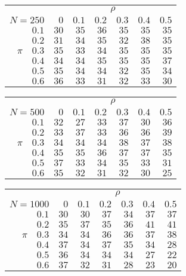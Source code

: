 \begin{tabular}{r|rrrrrr}
\hline\hline
 &\multicolumn{6}{c}{$\rho$} \\ 
 $N = 250$ & $0$ & $0.1$ & $0.2$ & $0.3$ & $0.4$ & $0.5$ \\ 
 \hline$0.1$ & $30$ & $35$ & $36$ & $35$ & $35$ & $35$\\ 
$0.2$ & $31$ & $34$ & $35$ & $32$ & $38$ & $35$\\ 
$\pi\quad$$0.3$ & $35$ & $33$ & $34$ & $35$ & $35$ & $35$\\ 
$0.4$ & $34$ & $34$ & $35$ & $35$ & $35$ & $37$\\ 
$0.5$ & $35$ & $34$ & $34$ & $32$ & $35$ & $34$\\ 
$0.6$ & $36$ & $33$ & $31$ & $32$ & $33$ & $30$\\ 
 \hline 
 \end{tabular}
 
 \vspace{2em} 
 
\begin{tabular}{r|rrrrrr}
\hline\hline
 &\multicolumn{6}{c}{$\rho$} \\ 
 $N = 500$ & $0$ & $0.1$ & $0.2$ & $0.3$ & $0.4$ & $0.5$ \\ 
 \hline$0.1$ & $32$ & $27$ & $33$ & $37$ & $30$ & $36$\\ 
$0.2$ & $33$ & $37$ & $33$ & $36$ & $36$ & $39$\\ 
$\pi\quad$$0.3$ & $34$ & $34$ & $34$ & $38$ & $37$ & $38$\\ 
$0.4$ & $35$ & $35$ & $36$ & $37$ & $37$ & $35$\\ 
$0.5$ & $37$ & $33$ & $34$ & $35$ & $33$ & $31$\\ 
$0.6$ & $35$ & $32$ & $31$ & $32$ & $30$ & $25$\\ 
 \hline 
 \end{tabular}
 
 \vspace{2em} 
 
\begin{tabular}{r|rrrrrr}
\hline\hline
 &\multicolumn{6}{c}{$\rho$} \\ 
 $N = 1000$ & $0$ & $0.1$ & $0.2$ & $0.3$ & $0.4$ & $0.5$ \\ 
 \hline$0.1$ & $30$ & $30$ & $37$ & $34$ & $37$ & $37$\\ 
$0.2$ & $35$ & $37$ & $35$ & $36$ & $41$ & $41$\\ 
$\pi\quad$$0.3$ & $34$ & $34$ & $36$ & $36$ & $37$ & $38$\\ 
$0.4$ & $37$ & $34$ & $37$ & $35$ & $34$ & $28$\\ 
$0.5$ & $36$ & $34$ & $34$ & $34$ & $27$ & $22$\\ 
$0.6$ & $37$ & $32$ & $31$ & $28$ & $23$ & $20$\\ 
 \hline 
 \end{tabular}
